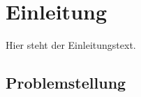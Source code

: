 \newpage

\section{Einleitung} \label{einleitung}
Hier steht der Einleitungstext.

\subsection{Problemstellung} \label{problemstellung}





